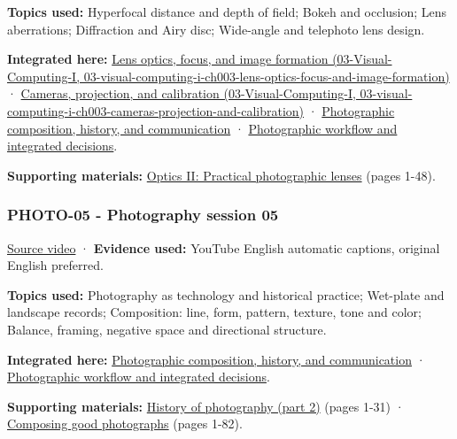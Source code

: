 \textbf{Topics used:} Hyperfocal distance and depth of field; Bokeh and occlusion; Lens aberrations; Diffraction and Airy disc; Wide-angle and telephoto lens design.

\textbf{Integrated here:} \href{../03-Visual-Computing-I/main.pdf\#nameddest=03-visual-computing-i-ch003-lens-optics-focus-and-image-formation}{Lens optics, focus, and image formation (03-Visual-Computing-I, 03-visual-computing-i-ch003-lens-optics-focus-and-image-formation)} · \href{../03-Visual-Computing-I/main.pdf\#nameddest=03-visual-computing-i-ch003-cameras-projection-and-calibration}{Cameras, projection, and calibration (03-Visual-Computing-I, 03-visual-computing-i-ch003-cameras-projection-and-calibration)} · \hyperref[04-visual-computing-ii-ch034-photographic-composition-history-and-communication]{Photographic composition, history, and communication} · \hyperref[04-visual-computing-ii-ch034-photographic-workflow-and-integrated-decisions]{Photographic workflow and integrated decisions}.

\textbf{Supporting materials:} \href{https://drive.google.com/open?id=0B6w2XfPHEcZYTnZIR2VpWThHM0U}{Optics II: Practical photographic lenses} (pages 1-48).

\subsubsection{PHOTO-05 - Photography session 05}\label{04-visual-computing-ii-ch036-photo-05---photography-session-05}

\href{https://www.youtube.com/watch?v=VCcDJAiObEw}{Source video} · \textbf{Evidence used:} YouTube English automatic captions, original English preferred.

\textbf{Topics used:} Photography as technology and historical practice; Wet-plate and landscape records; Composition: line, form, pattern, texture, tone and color; Balance, framing, negative space and directional structure.

\textbf{Integrated here:} \hyperref[04-visual-computing-ii-ch034-photographic-composition-history-and-communication]{Photographic composition, history, and communication} · \hyperref[04-visual-computing-ii-ch034-photographic-workflow-and-integrated-decisions]{Photographic workflow and integrated decisions}.

\textbf{Supporting materials:} \href{https://drive.google.com/open?id=0B6w2XfPHEcZYNm5MczhBTkxsanc}{History of photography (part 2)} (pages 1-31) · \href{https://drive.google.com/file/d/0B6w2XfPHEcZYSkZXWG9mSGpFMVk/view?usp=sharing}{Composing good photographs} (pages 1-82).

